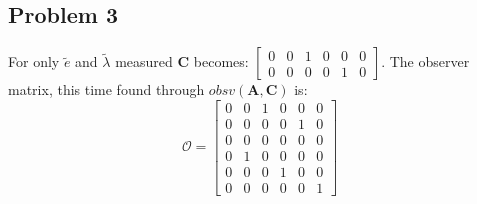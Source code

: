\subsection{Problem 3}
For only $\tilde{e}$ and $\tilde{\lambda}$ measured $\bm{C}$ becomes:
	$\begin{bmatrix}
    0 & 0 & 1 & 0 & 0 & 0 \\
    0 & 0 & 0 & 0 & 1 & 0
	\end{bmatrix}$.
The observer matrix, this time found through $obsv(\bm{A},\bm{C})$ is:
\begin{equation}
	\bm{\mathcal{O}} =
  \begin{bmatrix}
    0 & 0 & 1 & 0 & 0 & 0 \\
    0 & 0 & 0 & 0 & 1 & 0 \\
    0 & 0 & 0 & 0 & 0 & 0 \\
    0 & 1 & 0 & 0 & 0 & 0 \\
    0 & 0 & 0 & 1 & 0 & 0 \\
    0 & 0 & 0 & 0 & 0 & 1
	\end{bmatrix}
\end{equation}